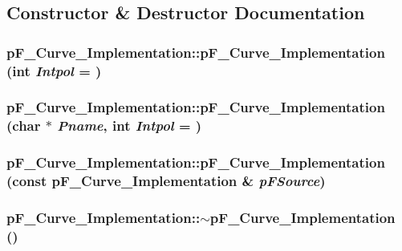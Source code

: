 \subsection{Constructor \& Destructor Documentation}
\hypertarget{classp_f___curve___implementation_a86be0b163ac80b4ecb0a2e7486bfa7d9}{
\subsubsection[{pF\_\-Curve\_\-Implementation}]{\setlength{\rightskip}{0pt plus 5cm}pF\_\-Curve\_\-Implementation::pF\_\-Curve\_\-Implementation (int {\em Intpol} = {})}}
\label{classp_f___curve___implementation_a86be0b163ac80b4ecb0a2e7486bfa7d9}
\hypertarget{classp_f___curve___implementation_a5e0578b3de98bb56eea5b40a24961659}{
\subsubsection[{pF\_\-Curve\_\-Implementation}]{\setlength{\rightskip}{0pt plus 5cm}pF\_\-Curve\_\-Implementation::pF\_\-Curve\_\-Implementation (char $\ast$ {\em Pname}, \/  int {\em Intpol} = {})}}
\label{classp_f___curve___implementation_a5e0578b3de98bb56eea5b40a24961659}
\hypertarget{classp_f___curve___implementation_a7d1368d2fa1f8b27237c43830ec03c56}{
\subsubsection[{pF\_\-Curve\_\-Implementation}]{\setlength{\rightskip}{0pt plus 5cm}pF\_\-Curve\_\-Implementation::pF\_\-Curve\_\-Implementation (const {\bf pF\_\-Curve\_\-Implementation} \& {\em pFSource})}}
\label{classp_f___curve___implementation_a7d1368d2fa1f8b27237c43830ec03c56}
\hypertarget{classp_f___curve___implementation_a1741e2601605b0fa1a7f578d4df25528}{
\subsubsection[{$\sim$pF\_\-Curve\_\-Implementation}]{\setlength{\rightskip}{0pt plus 5cm}pF\_\-Curve\_\-Implementation::$\sim$pF\_\-Curve\_\-Implementation ()}}
\label{classp_f___curve___implementation_a1741e2601605b0fa1a7f578d4df25528}


